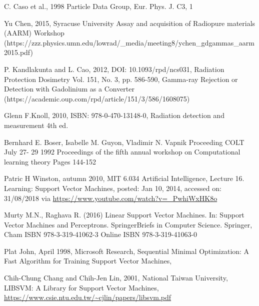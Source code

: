 \documentclass[12pt,a4paper]{article}
\begin{document}
\begin{thebibliography}{9}
C. Caso et al., 1998 Particle Data Group, Eur. Phys. J. C3, 1 

Yu Chen, 2015, Syracuse University Assay and acquisition of Radiopure materials (AARM) Workshop (https://zzz.physics.umn.edu/lowrad/\_media/meeting8/ychen\_gdgammas\_aarm2015.pdf)

P. Kandlakunta and L. Cao, 2012, DOI: 10.1093/rpd/ncs031, Radiation Protection Dosimetry  Vol. 151, No. 3, pp. 586-590, Gamma-ray Rejection or Detection with Gadolinium as a Converter (https://academic.oup.com/rpd/article/151/3/586/1608075)

Glenn F.Knoll, 2010, ISBN: 978-0-470-13148-0, Radiation detection and measurement 4th ed.  


Bernhard E. Boser, Isabelle M. Guyon, Vladimir N. Vapnik Proceeding COLT July 27- 29 1992 Proceedings of the fifth annual workshop on Computational learning theory Pages 144-152 %

Patric H Winston, autumn 2010, MIT 6.034 Artificial Intelligence, Lecture 16. Learning: Support Vector Machines, posted:  Jan 10, 2014, accessed on: 31/08/2018 via \url{https://www.youtube.com/watch?v=_PwhiWxHK8o}

Murty M.N., Raghava R. (2016) Linear Support Vector Machines. In: Support Vector Machines and Perceptrons. SpringerBriefs in Computer Science. Springer, Cham ISBN 978-3-319-41062-3 Online ISBN 978-3-319-41063-0 

Plat John, April 1998, Microsoft Research, Sequential Minimal Optimization:  A Fast Algorithm for Training Support Vector Machines, %

Chih-Chung Chang and Chih-Jen Lin, 2001, National Taiwan University, LIBSVM: A Library for Support Vector Machines,  \url{https://www.csie.ntu.edu.tw/~cjlin/papers/libsvm.pdf} 


\end{thebibliography}
\end{document}
